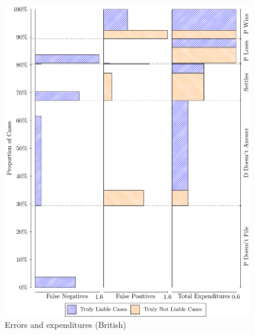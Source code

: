 \documentclass{article}
\begin{document}
\begin{figure}
\begin{minipage}{0.48\textwidth}
        \includegraphics[width=0.98\textwidth, scale=0.70, trim={0in 0in 0in 0in}, clip]{../Figures/Source of error costs and expenditures (British)} %
        \caption{Errors and expenditures (British)}
		\label{fig:errors_british}
    \end{minipage}
\end{figure}
\end{document}
